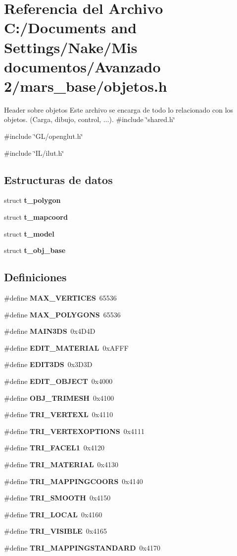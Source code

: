 \section{Referencia del Archivo C:/Documents and Settings/Nake/Mis documentos/Avanzado 2/mars\_\-base/objetos.h}
\label{objetos_8h}


Header sobre objetos Este archivo se encarga de todo lo relacionado con los objetos. (Carga, dibujo, control, ...).  
{\ttfamily \#include \char`\"{}shared.h\char`\"{}}\par
{\ttfamily \#include \char`\"{}GL/openglut.h\char`\"{}}\par
{\ttfamily \#include \char`\"{}IL/ilut.h\char`\"{}}\par
\subsection*{Estructuras de datos}
\begin{DoxyCompactItemize}
\item 
struct {\bf t\_\-polygon}
\item 
struct {\bf t\_\-mapcoord}
\item 
struct {\bf t\_\-model}
\item 
struct {\bf t\_\-obj\_\-base}
\end{DoxyCompactItemize}
\subsection*{Definiciones}
\begin{DoxyCompactItemize}
\item 
\#define {\bf MAX\_\-VERTICES}~65536
\item 
\#define {\bf MAX\_\-POLYGONS}~65536
\item 
\#define {\bf MAIN3DS}~0x4D4D
\item 
\#define {\bf EDIT\_\-MATERIAL}~0xAFFF
\item 
\#define {\bf EDIT3DS}~0x3D3D
\item 
\#define {\bf EDIT\_\-OBJECT}~0x4000
\item 
\#define {\bf OBJ\_\-TRIMESH}~0x4100
\item 
\#define {\bf TRI\_\-VERTEXL}~0x4110
\item 
\#define {\bf TRI\_\-VERTEXOPTIONS}~0x4111
\item 
\#define {\bf TRI\_\-FACEL1}~0x4120
\item 
\#define {\bf TRI\_\-MATERIAL}~0x4130
\item 
\#define {\bf TRI\_\-MAPPINGCOORS}~0x4140
\item 
\#define {\bf TRI\_\-SMOOTH}~0x4150
\item 
\#define {\bf TRI\_\-LOCAL}~0x4160
\item 
\#define {\bf TRI\_\-VISIBLE}~0x4165
\item 
\#define {\bf TRI\_\-MAPPINGSTANDARD}~0x4170
\end{DoxyCompactItemize}
